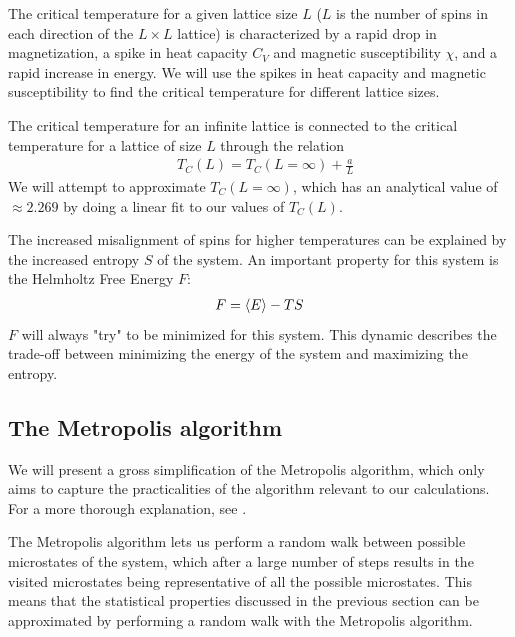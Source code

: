 \documentclass[reprint,english,notitlepage]{revtex4-1}
\begin{document}
	The critical temperature for a given lattice size $L$ ($L$ is the number of spins in each direction of the $L \times L$ lattice) is characterized by a rapid drop in magnetization, a spike in heat capacity $C_V$ and magnetic susceptibility $\chi$, and a rapid increase in energy. We will use the spikes in heat capacity and magnetic susceptibility to find the critical temperature for different lattice sizes.
	
	The critical temperature for an infinite lattice is connected to the critical temperature for a lattice of size $L$ through the relation
	\begin{equation}
	\label{eq:tc}
	\begin{aligned}
	&T_C(L) = T_C(L=\infty) + \frac{a}{L}
	\end{aligned}
	\end{equation}
	We will attempt to approximate $T_C(L=\infty)$, which has an analytical value of $\approx2.269$ by doing a linear fit to our values of $T_C(L)$.
	
	The increased misalignment of spins for higher temperatures can be explained by the increased entropy $S$ of the system. An important property for this system is the Helmholtz Free Energy $F$:
	\begin{equation}
	\label{eq:helmholtz}
	\begin{aligned}
	F = \expval{E} - TS
	\end{aligned}
	\end{equation}
	$F$ will always "try" to be minimized for this system. This dynamic describes the trade-off between minimizing the energy of the system and maximizing the entropy.
	
\subsection{The Metropolis algorithm}
	We will present a gross simplification of the Metropolis algorithm, which only aims to capture the practicalities of the algorithm relevant to our calculations. For a more thorough explanation, see \cite{compfys}.
	
	The Metropolis algorithm lets us perform a random walk between possible microstates of the system, which after a large number of steps results in the visited microstates being representative of all the possible microstates. This means that the statistical properties discussed in the previous section can be approximated by performing a random walk with the Metropolis algorithm.
	
\end{document}
